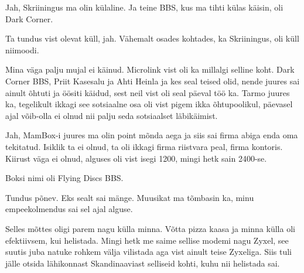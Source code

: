 Jah, Skriiningus ma olin külaline. Ja teine BBS, kus ma tihti 
külas käisin, oli Dark Corner.
                 

Ta tundus vist olevat küll, jah. Vähemalt osades kohtades, ka Skriiningus, oli 
küll niimoodi.


Mina väga palju mujal ei käinud. Microlink vist oli ka millalgi selline koht. 
Dark Corner BBS, Priit Kasesalu ja Ahti 
Heinla ja kes seal teised olid, nende juures sai 
ainult õhtuti ja öösiti käidud, sest neil vist oli seal päeval töö ka.
Tarmo juures ka, tegelikult ikkagi see sotsiaalne osa oli vist pigem ikka 
õhtupoolikul, päevasel ajal võib-olla ei olnud nii palju seda sotsiaalset 
läbikäimist.
                 
                 
Jah, MamBox-i juures ma olin point mõnda aega ja siis sai 
firma abiga enda oma tekitatud. Isiklik ta ei olnud, ta oli ikkagi firma 
riistvara peal, firma kontoris. Kiirust väga ei olnud, alguses oli vist isegi 
1200, mingi hetk sain 2400-se. 


Boksi nimi oli Flying Discs BBS. 


Tundus põnev. Eks sealt sai mänge. Muusikat ma tõmbasin ka, minu empeekolmendus 
sai sel ajal alguse.
                 

Selles mõttes oligi parem nagu külla minna. Võtta pizza kaasa ja minna külla 
oli efektiivsem, kui helistada. Mingi hetk me saime sellise modemi nagu 
Zyxel, see suutis juba natuke rohkem välja vilistada aga vist 
ainult teise Zyxeliga. Siis tuli jälle otsida lähikonnast Skandinaaviast 
selliseid kohti, kuhu nii helistada sai.



